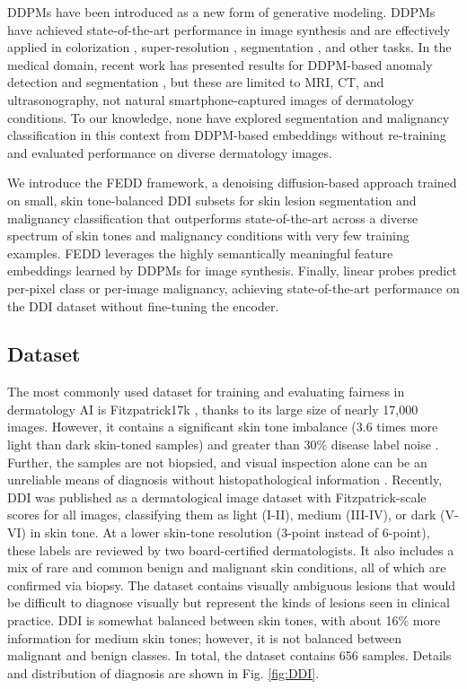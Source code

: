 \documentclass[11pt]{ucthesis}
\begin{document}
DDPMs have been introduced \cite{ho_2020_denoising} as a new form of generative modeling. DDPMs have achieved state-of-the-art performance in image synthesis \cite{dhariwal_2021_diffusion} and are effectively applied in colorization \cite{song_2021_scorebased}, super-resolution \cite{saharia_2022_image}, segmentation \cite{baranchuk_2022_labelefficient}, and other tasks. In the medical domain, recent work has presented results for DDPM-based anomaly detection \cite{wolleb_2022_diffusion} and segmentation \cite{wu_2023_medsegdiffv2}, but these are limited to MRI, CT, and ultrasonography, not natural smartphone-captured images of dermatology conditions. To our knowledge, none have explored segmentation and malignancy classification in this context from DDPM-based embeddings without re-training and evaluated performance on diverse dermatology images.

We introduce the FEDD framework, a denoising diffusion-based approach trained on small, skin tone-balanced DDI \cite{daneshjou_2022_disparities} subsets for skin lesion segmentation and malignancy classification that outperforms state-of-the-art across a diverse spectrum of skin tones and malignancy conditions with very few training examples. FEDD leverages the highly semantically meaningful feature embeddings learned by DDPMs for image synthesis. Finally, linear probes predict per-pixel class or per-image malignancy, achieving state-of-the-art performance on the DDI dataset without fine-tuning the encoder.

\subsection{Dataset}
The most commonly used dataset for training and evaluating fairness in dermatology AI is Fitzpatrick17k \cite{groh_2021_evaluating,abid_2022_meaningfully,du_2023_fairdisco}, thanks to its large size of nearly 17,000 images. However, it contains a significant skin tone imbalance (3.6 times more light than dark skin-toned samples) and greater than 30\% disease label noise \cite{groh_2021_evaluating}. Further, the samples are not biopsied, and visual inspection alone can be an unreliable means of diagnosis without histopathological information \cite{daneshjou_2022_checklist}. Recently, DDI \cite{daneshjou_2022_disparities} was published as a dermatological image dataset with Fitzpatrick-scale \cite{fitzpatrick_1988_the} scores for all images, classifying them as light (I-II), medium (III-IV), or dark (V-VI) in skin tone. At a lower skin-tone resolution (3-point instead of 6-point), these labels are reviewed by two board-certified dermatologists. It also includes a mix of rare and common benign and malignant skin conditions, all of which are confirmed via biopsy. The dataset contains visually ambiguous lesions that would be difficult to diagnose visually but represent the kinds of lesions seen in clinical practice. DDI is somewhat balanced between skin tones, with about 16\% more information for medium skin tones; however, it is not balanced between malignant and benign classes. In total, the dataset contains 656 samples. Details and distribution of diagnosis are shown in Fig. \ref{fig:DDI}.
\end{document}
